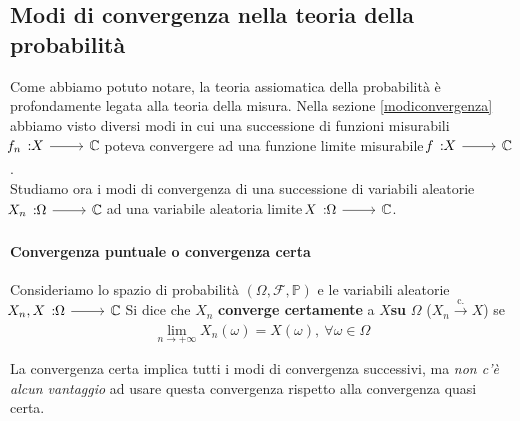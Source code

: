 \subsection{Modi di convergenza nella teoria della probabilità}
Come abbiamo potuto notare, la teoria assiomatica della probabilità è profondamente legata alla teoria della misura. Nella sezione \ref{modiconvergenza} abbiamo visto diversi modi in cui una successione di funzioni misurabili $\funz{f_n}{X}{\complexset}$ poteva convergere ad una funzione limite misurabile $\funz{f}{X}{\complexset}$.\\
Studiamo ora i modi di convergenza di una successione di variabili aleatorie $\funz{X_n}{\Omega}{\complexset}$ ad una variabile aleatoria limite $\funz{X}{\Omega}{\complexset}$.
\paragraph{Convergenza puntuale o convergenza certa}
\begin{define}
	Consideriamo lo spazio di probabilità $\left(\Omega,\mathcal{F},\mathbb{P}\right)$ e le variabili aleatorie $\funz{X_n,X}{\Omega}{\complexset}$
	Si dice che $X_n$ \textbf{converge certamente} a $X$\textbf{su} $\Omega$ ($X_n\overset{\text{c.}}{\to} X$) se
	\begin{equation}
		\lim_{n\to+\infty}X_n\left(\omega\right)=X\left(\omega\right),\ \forall \omega\in\Omega
	\end{equation}
\end{define}
La convergenza certa implica tutti i modi di convergenza successivi, ma \textit{non c'è alcun vantaggio} ad usare questa convergenza rispetto alla convergenza quasi certa.
